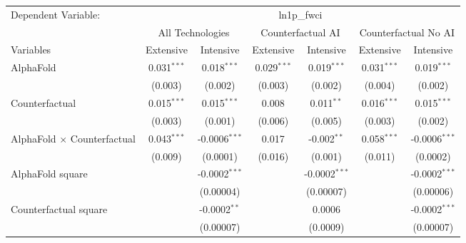 \begingroup
\centering
\begin{tabular}{lcccccc}
   \tabularnewline \midrule \midrule
   Dependent Variable: & \multicolumn{6}{c}{ln1p\_fwci}\\
 & \multicolumn{2}{c}{All Technologies} & \multicolumn{2}{c}{Counterfactual AI} & \multicolumn{2}{c}{Counterfactual No AI} \\
\cmidrule(lr){1-1}\cmidrule(lr){2-3} \cmidrule(lr){4-5} \cmidrule(lr){6-7}
Variables & \multicolumn{1}{c}{Extensive} & \multicolumn{1}{c}{Intensive} & \multicolumn{1}{c}{Extensive} & \multicolumn{1}{c}{Intensive} & \multicolumn{1}{c}{Extensive} & \multicolumn{1}{c}{Intensive} \\
\cmidrule(lr){1-1}\cmidrule(lr){2-2} \cmidrule(lr){3-3} \cmidrule(lr){4-4} \cmidrule(lr){5-5} \cmidrule(lr){6-6} \cmidrule(lr){7-7}
   AlphaFold                          & 0.031$^{***}$ & 0.018$^{***}$     & 0.029$^{***}$ & 0.019$^{***}$   & 0.031$^{***}$ & 0.019$^{***}$\\   
                                      & (0.003)       & (0.002)           & (0.003)       & (0.002)         & (0.004)       & (0.002)\\   
   Counterfactual                     & 0.015$^{***}$ & 0.015$^{***}$     & 0.008         & 0.011$^{**}$    & 0.016$^{***}$ & 0.015$^{***}$\\   
                                      & (0.003)       & (0.001)           & (0.006)       & (0.005)         & (0.003)       & (0.002)\\   
   AlphaFold $\times$ Counterfactual  & 0.043$^{***}$ & -0.0006$^{***}$   & 0.017         & -0.002$^{**}$   & 0.058$^{***}$ & -0.0006$^{***}$\\   
                                      & (0.009)       & (0.0001)          & (0.016)       & (0.001)         & (0.011)       & (0.0002)\\   
   AlphaFold square                   &               & -0.0002$^{***}$   &               & -0.0002$^{***}$ &               & -0.0002$^{***}$\\   
                                      &               & (0.00004)         &               & (0.00007)       &               & (0.00006)\\   
   Counterfactual square              &               & -0.0002$^{**}$    &               & 0.0006          &               & -0.0002$^{***}$\\   
                                      &               & (0.00007)         &               & (0.0009)        &               & (0.00007)\\   

\end{tabular}
